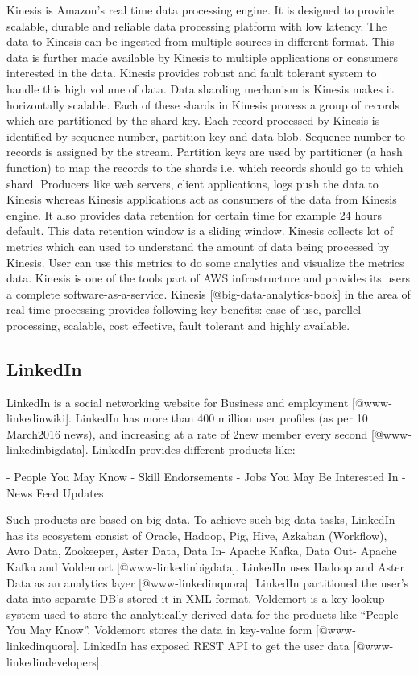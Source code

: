 Kinesis is Amazon's real time data processing engine. It is designed
to provide scalable, durable and reliable data processing platform
with low latency\cite{www-kinesis}.  The data to Kinesis can be
ingested from multiple sources in different format. This data is
further made available by Kinesis to multiple applications or
consumers interested in the data. Kinesis provides robust and fault
tolerant system to handle this high volume of data. Data sharding
mechanism is Kinesis makes it horizontally scalable. Each of these
shards in Kinesis process a group of records which are partitioned by
the shard key. Each record processed by Kinesis is identified by
sequence number, partition key and data blob. Sequence number to
records is assigned by the stream. Partition keys are used by
partitioner (a hash function) to map the records to the shards
i.e. which records should go to which shard. Producers like web
servers, client applications, logs push the data to Kinesis whereas
Kinesis applications act as consumers of the data from Kinesis
engine. It also provides data retention for certain time for example
24 hours default. This data retention window is a sliding
window. Kinesis collects lot of metrics which can used to understand
the amount of data being processed by Kinesis.  User can use this
metrics to do some analytics and visualize the metrics data.  Kinesis
is one of the tools part of AWS infrastructure and provides its users
a complete
software-as-a-service. Kinesis [@big-data-analytics-book] in the
area of real-time processing provides following key benefits: ease of
use, parellel processing, scalable, cost effective, fault tolerant and
highly available.



\subsection{LinkedIn}
     
LinkedIn is a social networking website for Business and
employment [@www-linkedinwiki]. LinkedIn has more than 400 million
user profiles (as per 10 March2016 news), and increasing at a rate of
2new member every second [@www-linkedinbigdata].  LinkedIn
provides different products like:

- People You May Know
- Skill Endorsements
- Jobs You May Be Interested In
- News Feed Updates

Such products are based on big data. To achieve such big data tasks,
LinkedIn has its ecosystem consist of Oracle, Hadoop, Pig, Hive,
Azkaban (Workflow), Avro Data, Zookeeper, Aster Data, Data In- Apache
Kafka, Data Out- Apache Kafka and Voldemort
[@www-linkedinbigdata]. LinkedIn uses Hadoop and Aster Data as
an analytics layer [@www-linkedinquora]. LinkedIn partitioned
the user's data into separate DB's stored it in XML format. Voldemort
is a key lookup system used to store the analytically-derived data for
the products like ``People You May Know''. Voldemort stores the data
in key-value form [@www-linkedinquora]. LinkedIn has exposed
REST API to get the user data [@www-linkedindevelopers].

